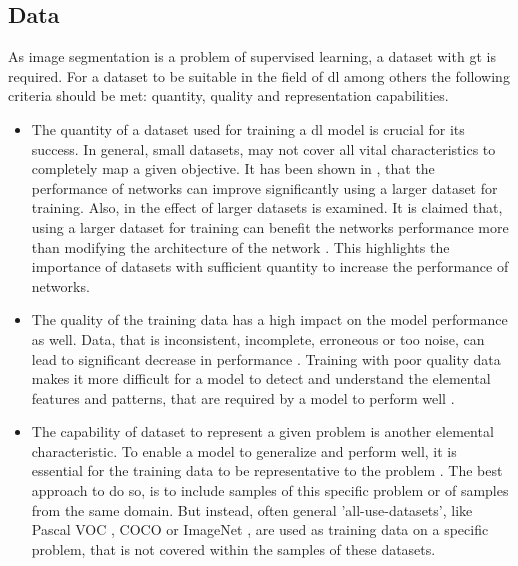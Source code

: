 \subsection{Data}\label{ord:ch2:sec2:subsec4}
As image segmentation is a problem of supervised learning, a dataset with \gls{gt} is required.
For a dataset to be suitable in the field of \gls{dl} among others the following criteria should be met: quantity, quality and representation capabilities.
\begin{itemize}
	\item The quantity of a dataset used for training a \gls{dl} model is crucial for its success.
	In general, small datasets, may not cover all vital characteristics to completely map a given objective.
	It has been shown in \cite{Banko01-ScalingData}, that the performance of networks can improve significantly using a larger dataset for training.
	Also, in \cite{Halevy09-UnreasonableEffectivenessOfData} the effect of larger datasets is examined. 
	It is claimed that, using a larger dataset for training can benefit the networks performance more than modifying the architecture of the network \cite{Ger17-HandsOn}.
	This highlights the importance of datasets with sufficient quantity to increase the performance of networks.
	\item The quality of the training data has a high impact on the model performance as well.
	Data, that is inconsistent, incomplete, erroneous or too noise, can lead to significant decrease in performance \cite{Gudivada2017-DataQuality}.
	Training with poor quality data makes it more difficult for a model to detect and understand the elemental features and patterns, that are required by a model to perform well \cite{Ger17-HandsOn}.
	\item The capability of dataset to represent a given problem is another elemental characteristic.
	To enable a model to generalize and perform well, it is essential for the training data to be representative to the problem \cite{Ger17-HandsOn}.
	The best approach to do so, is to include samples of this specific problem or of samples from the same domain.	
	But instead, often general 'all-use-datasets', like Pascal VOC \cite{Eve20-PascalVOC}, COCO \cite{Lin14-Coco} or ImageNet \cite{Deng09-ImageNet}, are used as training data on a specific problem, that is not covered within the samples of these datasets.

\end{itemize}
